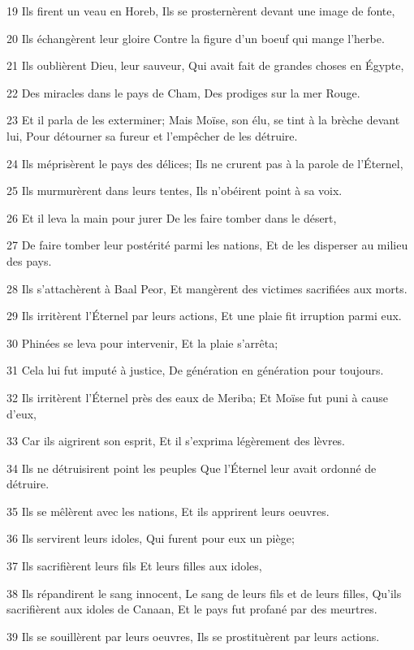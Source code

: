 \par 19 Ils firent un veau en Horeb, Ils se prosternèrent devant une image de fonte,
\par 20 Ils échangèrent leur gloire Contre la figure d'un boeuf qui mange l'herbe.
\par 21 Ils oublièrent Dieu, leur sauveur, Qui avait fait de grandes choses en Égypte,
\par 22 Des miracles dans le pays de Cham, Des prodiges sur la mer Rouge.
\par 23 Et il parla de les exterminer; Mais Moïse, son élu, se tint à la brèche devant lui, Pour détourner sa fureur et l'empêcher de les détruire.
\par 24 Ils méprisèrent le pays des délices; Ils ne crurent pas à la parole de l'Éternel,
\par 25 Ils murmurèrent dans leurs tentes, Ils n'obéirent point à sa voix.
\par 26 Et il leva la main pour jurer De les faire tomber dans le désert,
\par 27 De faire tomber leur postérité parmi les nations, Et de les disperser au milieu des pays.
\par 28 Ils s'attachèrent à Baal Peor, Et mangèrent des victimes sacrifiées aux morts.
\par 29 Ils irritèrent l'Éternel par leurs actions, Et une plaie fit irruption parmi eux.
\par 30 Phinées se leva pour intervenir, Et la plaie s'arrêta;
\par 31 Cela lui fut imputé à justice, De génération en génération pour toujours.
\par 32 Ils irritèrent l'Éternel près des eaux de Meriba; Et Moïse fut puni à cause d'eux,
\par 33 Car ils aigrirent son esprit, Et il s'exprima légèrement des lèvres.
\par 34 Ils ne détruisirent point les peuples Que l'Éternel leur avait ordonné de détruire.
\par 35 Ils se mêlèrent avec les nations, Et ils apprirent leurs oeuvres.
\par 36 Ils servirent leurs idoles, Qui furent pour eux un piège;
\par 37 Ils sacrifièrent leurs fils Et leurs filles aux idoles,
\par 38 Ils répandirent le sang innocent, Le sang de leurs fils et de leurs filles, Qu'ils sacrifièrent aux idoles de Canaan, Et le pays fut profané par des meurtres.
\par 39 Ils se souillèrent par leurs oeuvres, Ils se prostituèrent par leurs actions.
